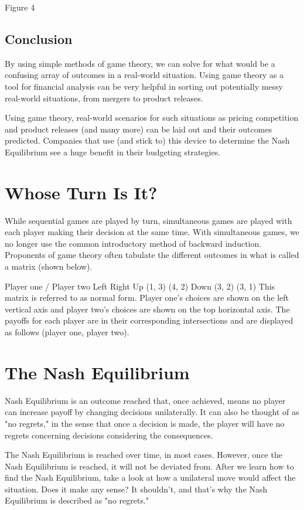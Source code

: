 Figure 4

\subsection{Conclusion}
By using simple methods of game theory, we can solve for what would be a confusing array 
of outcomes in a real-world situation. Using game theory as a tool for financial analysis can be very helpful in sorting out potentially messy real-world situations, from mergers to product releases.


Using game theory, real-world scenarios for such situations as pricing competition and 
product releases (and many more) can be laid out and their outcomes predicted. 
Companies that use (and stick to) this device to determine the Nash Equilibrium see a 
huge benefit in their budgeting strategies.

\section{Whose Turn Is It?}
While sequential games are played by turn, simultaneous games are played with each player making their decision at the same time. With simultaneous games, we no longer use the common introductory method of backward induction. Proponents of game theory often tabulate the different outcomes in what is called a matrix (shown below).

Player one / Player two	Left	Right
Up	(1, 3)	(4, 2)
Down	(3, 2)	(3, 1)
This matrix is referred to as normal form. Player one's choices are shown on the left vertical axis and player two's choices are shown on the top horizontal axis. The payoffs for each player are in their corresponding intersections and are displayed as follows (player one, player two).

\section{The Nash Equilibrium}
Nash Equilibrium is an outcome reached that, once achieved, means no player can increase payoff by changing decisions unilaterally. It can also be thought of as "no regrets," in the sense that once a decision is made, the player will have no regrets concerning decisions considering the consequences.

The Nash Equilibrium is reached over time, in most cases. However, once the Nash Equilibrium is reached, it will not be deviated from. After we learn how to find the Nash Equilibrium, take a look at how a unilateral move would affect the situation. Does it make any sense? It shouldn't, and that's why the Nash Equilibrium is described as "no regrets."

